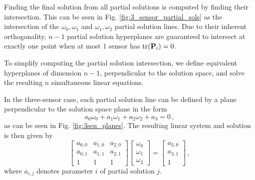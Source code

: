 \documentclass[letterpaper, 10 pt, conference]{ieeeconf}  %
\begin{document}
Finding the final solution from all partial solutions is computed by finding their intersection. This can be seen in Fig. \ref{fig:3_sensor_partial_sols} as the intersection of the $\omega_0,\omega_1$ and $\omega_1,\omega_2$ partial solution lines. Due to their inherent orthogonality, $n-1$ partial solution hyperplanes are guaranteed to intersect at exactly one point when at most $1$ sensor has $\operatorname{tr}({{\mathbf{P}}}_i)=0$.

To simplify computing the partial solution intersection, we define equivalent hyperplanes of dimension $n-1$, perpendicular to the solution space, and solve the resulting $n$ simultaneous linear equations.

In the three-sensor case, each partial solution line can be defined by a plane perpendicular to the solution space plane in the form
\begin{equation}
   a_0\omega_0 + a_1\omega_1 +a_2\omega_2 + a_3 = 0\,, \label{eqn:3sen_plane_eq}
\end{equation}
as can be seen in Fig. \ref{fig:3sen_planes}. The resulting linear system and solution is then given by
\begin{equation}
   \begin{bmatrix}
      a_{0,0} & a_{1,0} & a_{2,0} \\
      a_{0,1} & a_{1,1} & a_{2,1} \\
      1 & 1 & 1
   \end{bmatrix}
   \begin{bmatrix}
      \omega_0 \\
      \omega_1 \\
      \omega_2
   \end{bmatrix}
   =
   \begin{bmatrix}
      a_{3,0} \\
      a_{3,1} \\
      1
   \end{bmatrix}\,, \label{eqn:3sen_plane_sol_eq}
\end{equation}
where $a_{i,j}$ denotes parameter $i$ of partial solution $j$.
\end{document}
